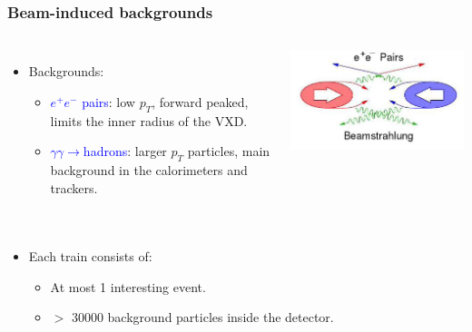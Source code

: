 \begin{frame}
  \frametitle{Beam-induced backgrounds}
  
  \begin{columns}
    \begin{itemize}
    \item Backgrounds:
      \begin{itemize}
      \item \textcolor{blue}{$e^{+}e^{-}$ pairs}: low $p_{T}$, forward
        peaked, limits the inner radius of the VXD.
      \item \textcolor{blue}{$\gamma\gamma\rightarrow$hadrons}: larger
        $p_{T}$ particles, main background in the calorimeters and
        trackers.
      \end{itemize}
    \end{itemize}
    
    \centering
    \includegraphics[width=\textwidth]{figures/beamstrahlung.png}
  \end{columns}

  \begin{columns}
    \begin{itemize}
    \item Each train consists of:
      \begin{itemize}
      \item At most 1 interesting event.
      \item $>$ 30000 background particles inside the detector.
      \end{itemize}
    \end{itemize}


\end{columns}
\end{frame}
